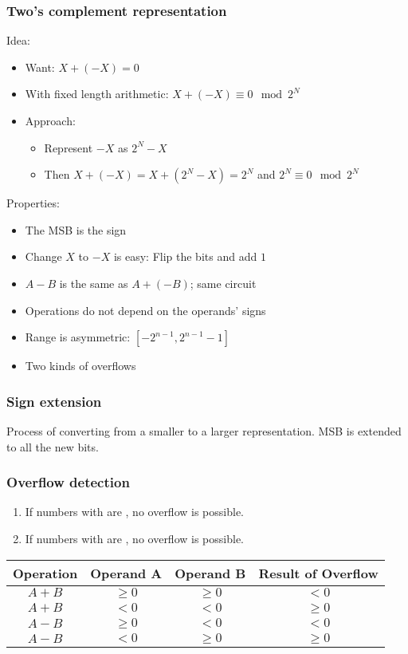 \documentclass{article}
\begin{document}
\subsubsection{Two's complement representation}
Idea:
\begin{itemize}
	\item Want: $X + (-X) = 0$
	\item With fixed length arithmetic: $X + (-X) \equiv 0 \mod 2^N$
	\item Approach:
	\begin{itemize}
		\item Represent $-X$ as $2^N-X$
		\item Then $X + (-X) = X + (2^N - X) = 2^N$ and $2^N \equiv 0 \mod 2^N$
	\end{itemize}
\end{itemize}
Properties:
\begin{itemize}
	\item The MSB is the sign
	\item Change $X$ to $-X$ is easy: Flip the bits and add $1$
	\item $A-B$ is the same as $A+(-B)$; same circuit
	\item Operations do not depend on the operands' signs
	\item Range is asymmetric: $[-2^{n-1}, 2^{n-1}-1]$
	\item Two kinds of overflows 
\end{itemize}
\subsubsection{Sign extension}
Process of converting from a smaller to a larger representation.
MSB is extended to all the new bits.
\subsubsection{Overflow detection}
\begin{enumerate}
	\item If numbers with  are , no overflow is possible.
	\item If numbers with  are , no overflow is possible.
\end{enumerate}
\begin{tabular}{| c | c | c | c |}
	\hline
	Operation & Operand A & Operand B & Result of Overflow\\
	\hline
	$A + B$ & $\geq 0$ & $\geq 0$ & $<0$\\
	\hline
	$A + B$ & $< 0$    & $< 0$    & $\geq 0$\\
	\hline
	$A - B$ & $\geq 0$ & $< 0$    & $<0$\\
	\hline
	$A - B$ & $< 0$    & $\geq 0$ & $\geq 0$\\
	\hline
\end{tabular}
\end{document}
